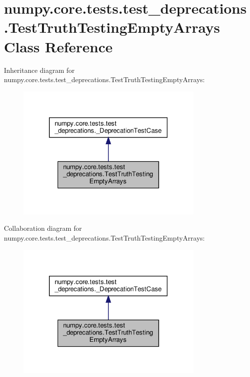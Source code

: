 \hypertarget{classnumpy_1_1core_1_1tests_1_1test__deprecations_1_1TestTruthTestingEmptyArrays}{}\section{numpy.\+core.\+tests.\+test\+\_\+deprecations.\+Test\+Truth\+Testing\+Empty\+Arrays Class Reference}
\label{classnumpy_1_1core_1_1tests_1_1test__deprecations_1_1TestTruthTestingEmptyArrays}


Inheritance diagram for numpy.\+core.\+tests.\+test\+\_\+deprecations.\+Test\+Truth\+Testing\+Empty\+Arrays\+:
\nopagebreak
\begin{figure}[H]
\begin{center}
\leavevmode
\includegraphics[width=261pt]{classnumpy_1_1core_1_1tests_1_1test__deprecations_1_1TestTruthTestingEmptyArrays__inherit__graph}
\end{center}
\end{figure}


Collaboration diagram for numpy.\+core.\+tests.\+test\+\_\+deprecations.\+Test\+Truth\+Testing\+Empty\+Arrays\+:
\nopagebreak
\begin{figure}[H]
\begin{center}
\leavevmode
\includegraphics[width=261pt]{classnumpy_1_1core_1_1tests_1_1test__deprecations_1_1TestTruthTestingEmptyArrays__coll__graph}
\end{center}
\end{figure}
